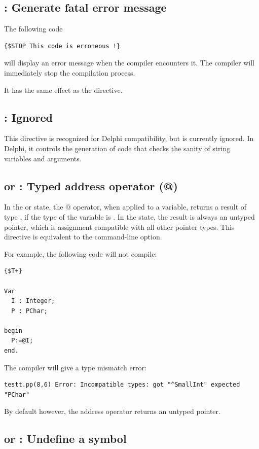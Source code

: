 \subsection{ : Generate fatal error message}

The following code
\begin{verbatim}
{$STOP This code is erroneous !}
\end{verbatim}
will display an error message when the compiler encounters it.
The compiler will immediately stop the compilation process.

It has the same effect as the  directive.

\subsection{ : Ignored}
This directive is recognized for Delphi compatibility, but is currently
ignored. In Delphi, it controls the generation of code that checks the
sanity of string variables and arguments.

\subsection{ or  : Typed address operator (@)}

In the  or  state, the @ operator,
when applied to a variable, returns a result of type , if the
type of the variable is . In the  state, the result is
always an untyped pointer, which is assignment compatible with all other
pointer types. This directive is equivalent to the  command-line
option.

For example, the following code will not compile:
\begin{verbatim}
{$T+}

Var
  I : Integer;
  P : PChar;

begin
  P:=@I;
end.
\end{verbatim}
The compiler will give a type mismatch error:
\begin{verbatim}
testt.pp(8,6) Error: Incompatible types: got "^SmallInt" expected "PChar"
\end{verbatim}

By default however, the address operator returns an untyped pointer.


\subsection{ or  : Undefine a symbol}

